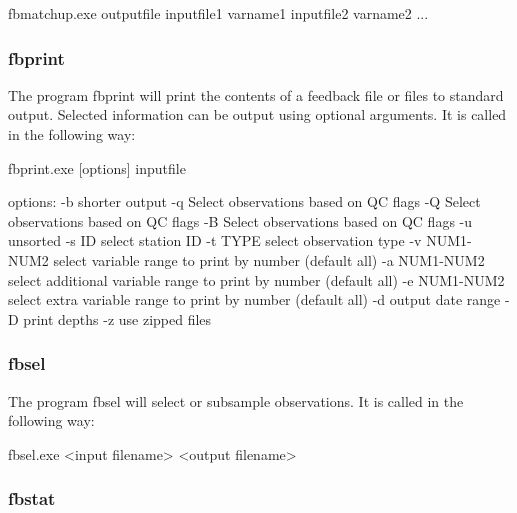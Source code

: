 \documentclass[../main/NEMO_manual]{subfiles}
\begin{document}
\begin{cmds}
fbmatchup.exe outputfile inputfile1 varname1 inputfile2 varname2 ...
\end{cmds}

\subsubsection{fbprint}

The program fbprint will print the contents of a feedback file or files to standard output.
Selected information can be output using optional arguments.
It is called in the following way:

\begin{cmds}
fbprint.exe [options] inputfile

options:
     -b            shorter output
     -q            Select observations based on QC flags
     -Q            Select observations based on QC flags
     -B            Select observations based on QC flags
     -u            unsorted
     -s ID         select station ID
     -t TYPE       select observation type
     -v NUM1-NUM2  select variable range to print by number
                      (default all)
     -a NUM1-NUM2  select additional variable range to print by number
                      (default all)
     -e NUM1-NUM2  select extra variable range to print by number
                      (default all)
     -d            output date range
     -D            print depths
     -z            use zipped files
\end{cmds}

\subsubsection{fbsel}

The program fbsel will select or subsample observations.
It is called in the following way:

\begin{cmds}
fbsel.exe <input filename> <output filename>
\end{cmds}

\subsubsection{fbstat}
\end{document}
